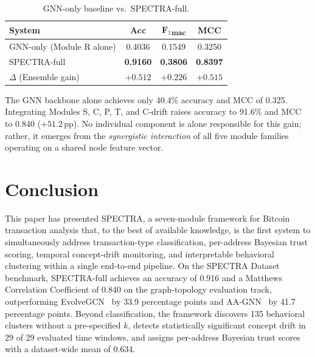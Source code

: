 \documentclass[journal]{IEEEtran}
\newcommand{\spectra}{\textsc{SPECTRA}}
\begin{document}
\begin{table}[t]
  \centering
  \renewcommand{\arraystretch}{1.15}
  \caption{GNN-only baseline vs.\ \spectra-full.}
  \label{tab:gnn_vs_full}
  \begin{tabular}{@{}lccc@{}}
    \toprule
    \textbf{System} & \textbf{Acc} & \textbf{F$_1$\textsubscript{mac}} & \textbf{MCC} \\
    \midrule
    GNN-only (Module R alone) & 0.4036 & 0.1549 & 0.3250 \\
    \spectra-full             & \textbf{0.9160} & \textbf{0.3806} & \textbf{0.8397} \\
    \midrule
    $\Delta$ (Ensemble gain)  & $+0.512$ & $+0.226$ & $+0.515$ \\
    \bottomrule
  \end{tabular}
\end{table}

The GNN backbone alone achieves only 40.4\% accuracy and MCC of 0.325.
Integrating Modules S, C, P, T, and C-drift raises accuracy to 91.6\% and
MCC to 0.840 ($+51.2$\,pp).  No individual component is alone responsible
for this gain; rather, it emerges from the \emph{synergistic interaction}
of all five module families operating on a shared node feature vector.

\FloatBarrier
\section{Conclusion}
\label{sec:conclusion}

This paper has presented \textsc{SPECTRA}, a seven-module framework for
Bitcoin transaction analysis that, to the best of available knowledge, is
the first system to simultaneously address transaction-type classification, per-address
Bayesian trust scoring, temporal concept-drift monitoring, and interpretable
behavioral clustering within a single end-to-end pipeline.
On the SPECTRA Dataset benchmark, \spectra-full achieves an accuracy of
\num{0.916} and a Matthews Correlation Coefficient of \num{0.840} on the
graph-topology evaluation track, outperforming EvolveGCN~\cite{Pareja2020}
by \num{33.9} percentage points and AA-GNN~\cite{ZhaoW2026} by
\num{41.7} percentage points.
Beyond classification, the framework discovers \num{135} behavioral clusters
without a pre-specified $k$, detects statistically significant concept drift
in \num{29} of \num{29} evaluated time windows, and assigns per-address
Bayesian trust scores with a dataset-wide mean of \num{0.634}.
\end{document}
